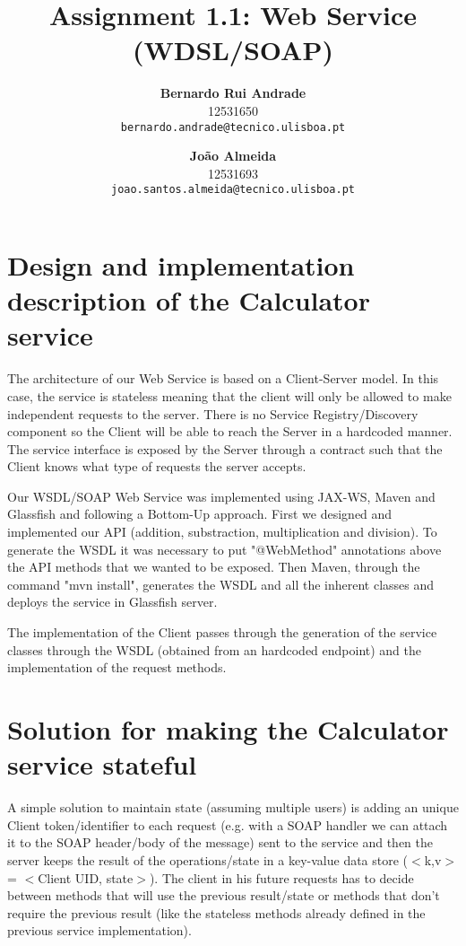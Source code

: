 \documentclass[a4paper]{article}
\begin{document}
\title{Assignment 1.1: Web Service (WDSL/SOAP)}
\author{
  \textbf{Bernardo Rui Andrade}\\
  12531650 \\
  \texttt{bernardo.andrade@tecnico.ulisboa.pt} \\
  \and
  \textbf{João Almeida}\\
 12531693\\
  \texttt{joao.santos.almeida@tecnico.ulisboa.pt} \\
}
\maketitle
\section*{Design and implementation description of the Calculator service}
The architecture of our Web Service is based on a Client-Server model. In this case, the service is stateless meaning that the client will only be allowed to make independent requests to the server. There is no Service Registry/Discovery component so the Client will be able to reach the Server in a hardcoded manner. The service interface is exposed by the Server through a contract such that the Client knows what type of requests the server accepts.\par
Our WSDL/SOAP Web Service was implemented using JAX-WS, Maven and Glassfish and following a Bottom-Up approach. First we designed and implemented our API (addition, substraction, multiplication and division). To generate the WSDL it was necessary to put "@WebMethod" annotations above the API methods that we wanted to be exposed. Then Maven, through the command "mvn install", generates the WSDL and all the inherent classes and deploys the service in Glassfish server.\par
The implementation of the Client passes through the generation of the service classes through the WSDL (obtained from an hardcoded endpoint) and the implementation of the request methods. 
\section*{Solution for making the Calculator service stateful}
A simple solution to maintain state (assuming multiple users) is adding an unique Client token/identifier to each request (e.g. with a SOAP handler we can attach it to the SOAP header/body of the message) sent to the service and then the server keeps the result of the operations/state in a key-value data store ($<$k,v$>$ = $<$Client UID, state$>$).  The client in his future requests has to decide between methods that will use the previous result/state or methods that don't require the previous result (like the stateless methods already defined in the previous service implementation).

 
\end{document}
